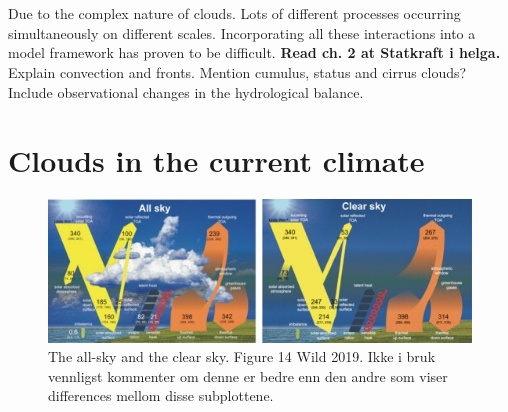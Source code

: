 \\ \\ 
Due to the complex nature of clouds. Lots of different processes occurring simultaneously on different scales. Incorporating all these interactions into a model framework has proven to be difficult. \textbf{Read ch. 2 at Statkraft i helga.} Explain convection and fronts. Mention cumulus, status and cirrus clouds?
Include observational changes in the hydrological balance. 

\section{Clouds in the current climate} \label{sec:intro_cloud_current_climate}
\begin{figure}[h] %
    \centering
    \includegraphics[scale = 7]{Chapter1_Intro/images/both_wild2019.jpg}
    \caption{The all-sky and the clear sky. Figure 14 Wild 2019. Ikke i bruk vennligst kommenter om denne er bedre enn den andre som viser differences mellom disse subplottene.}
    \label{fig:both_wild}
\end{figure}

